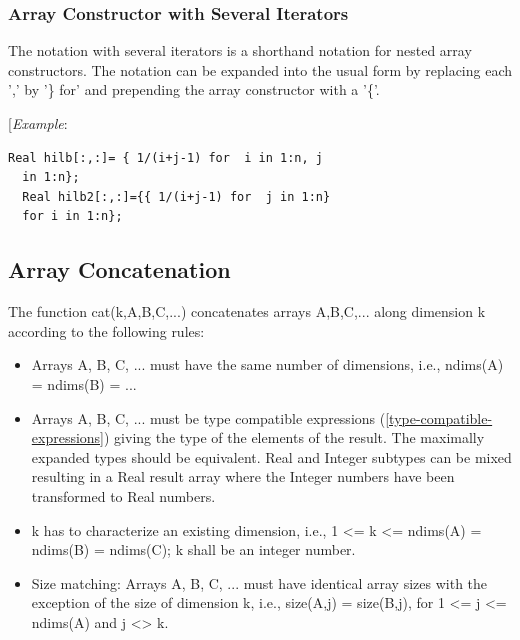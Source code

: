 \documentclass[10pt,a4paper]{report}
\def\doublelabel#1{\label{#1}\hypertarget{#1}{}}
\begin{document}
\subsubsection{Array Constructor with Several Iterators}\doublelabel{array-constructor-with-several-iterators}

The notation with several iterators is a shorthand notation for nested
array constructors. The notation can be expanded into the usual form by
replacing each ',' by '\} for' and prepending the array constructor with
a '\{'.

{[}\emph{Example}:

\begin{lstlisting}[language=modelica]
  Real hilb[:,:]= { 1/(i+j-1) for  i in 1:n, j
  in 1:n};
  Real hilb2[:,:]={{ 1/(i+j-1) for  j in 1:n}
  for i in 1:n};
\end{lstlisting}
\subsection{Array Concatenation}\doublelabel{array-concatenation}

The function cat(k,A,B,C,...) concatenates arrays A,B,C,... along
dimension k according to the following rules:

\begin{itemize}
\item
  Arrays A, B, C, ... must have the same number of dimensions, i.e.,
  ndims(A) = ndims(B) = ...
\end{itemize}

\begin{itemize}
\item
  Arrays A, B, C, ... must be type compatible expressions (\ref{type-compatible-expressions})
  giving the type of the elements of the result. The maximally expanded
  types should be equivalent. Real and Integer subtypes can be mixed
  resulting in a Real result array where the Integer numbers have been
  transformed to Real numbers.
\item
  k has to characterize an existing dimension, i.e., 1 \textless{}= k
  \textless{}= ndims(A) = ndims(B) = ndims(C); k shall be an integer
  number.
\item
  Size matching: Arrays A, B, C, ... must have identical array sizes
  with the exception of the size of dimension k, i.e., size(A,j) =
  size(B,j), for 1 \textless{}= j \textless{}= ndims(A) and j
  \textless{}\textgreater{} k.
\end{itemize}
\end{document}
